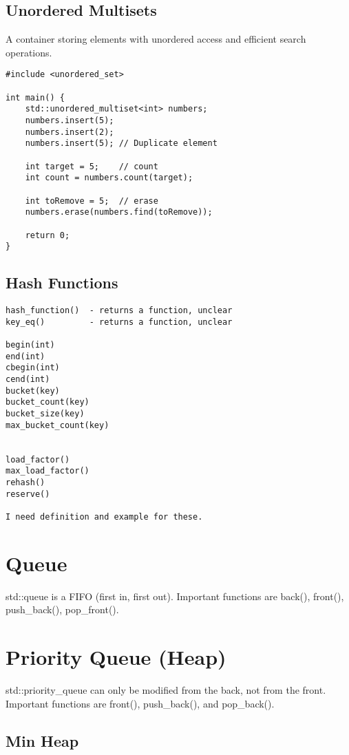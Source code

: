 \subsection{Unordered Multisets}

A container storing elements with unordered access and efficient search operations.

\begin{verbatim}
#include <unordered_set>

int main() {
    std::unordered_multiset<int> numbers;
    numbers.insert(5);
    numbers.insert(2);
    numbers.insert(5); // Duplicate element

    int target = 5;    // count  
    int count = numbers.count(target); 

    int toRemove = 5;  // erase
    numbers.erase(numbers.find(toRemove));

    return 0;
}
\end{verbatim}

\subsection{Hash Functions}

\begin{verbatim}
hash_function()  - returns a function, unclear
key_eq()         - returns a function, unclear 

begin(int)
end(int)
cbegin(int)
cend(int)
bucket(key)
bucket_count(key)
bucket_size(key)
max_bucket_count(key)


load_factor()
max_load_factor()
rehash()
reserve()

I need definition and example for these.
\end{verbatim}

\section{Queue}
std::queue is a FIFO (first in, first out). Important functions are back(), front(), push\_back(), pop\_front().

\section{Priority Queue (Heap)}

std::priority\_queue can only be modified from the back, not from the front. Important functions are front(), push\_back(), 
and pop\_back().

\subsection{Min Heap}
